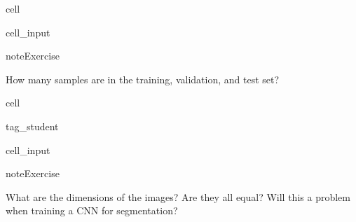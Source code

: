\documentclass[letterpaper,10pt,english]{jupyterBook}
\begin{document}
\begin{sphinxuseclass}{cell}\begin{sphinxVerbatimInput}

\begin{sphinxuseclass}{cell_input}
\begin{sphinxVerbatim}[commandchars=\\\{\}]
   
   
\end{sphinxVerbatim}

\end{sphinxuseclass}\end{sphinxVerbatimInput}

\end{sphinxuseclass}
\begin{sphinxadmonition}{note}{Exercise}

\sphinxAtStartPar
How many samples are in the training, validation, and test set?
\end{sphinxadmonition}

\begin{sphinxuseclass}{cell}
\begin{sphinxuseclass}{tag_student}\begin{sphinxVerbatimInput}

\begin{sphinxuseclass}{cell_input}
\begin{sphinxVerbatim}[commandchars=\\\{\}]
\end{sphinxVerbatim}

\end{sphinxuseclass}\end{sphinxVerbatimInput}

\end{sphinxuseclass}
\end{sphinxuseclass}
\begin{sphinxadmonition}{note}{Exercise}

\sphinxAtStartPar
What are the dimensions of the images? Are they all equal? Will this a problem when training a CNN for segmentation?
\end{sphinxadmonition}
\end{document}
